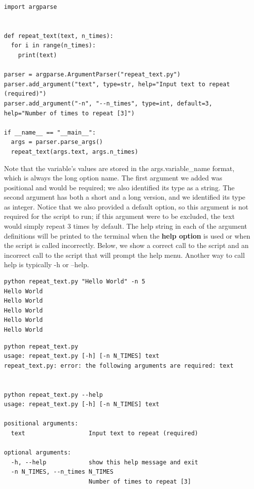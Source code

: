 \documentclass[a4paper,11pt]{article}
\begin{document}
\vspace{3mm}
\begin{lstlisting}
import argparse


def repeat_text(text, n_times):
  for i in range(n_times):
    print(text)

parser = argparse.ArgumentParser("repeat_text.py")
parser.add_argument("text", type=str, help="Input text to repeat (required)")
parser.add_argument("-n", "--n_times", type=int, default=3, help="Number of times to repeat [3]")

if __name__ == "__main__":
  args = parser.parse_args()
  repeat_text(args.text, args.n_times)

\end{lstlisting}
\vspace{3mm}

Note that the variable's values are stored in the args.variable\_name format, which is always the long option name.
The first argument we added was positional and would be required; we also identified its type as a string.  
The second argument has both a short and a long version, and we identified its type as integer.  Notice 
that we also provided a default option, so this argument is not required for the script to run; if this 
argument were to be excluded, the text would simply repeat 3 times by default.  The help string in each 
of the argument definitions will be printed to the terminal when the \textbf{help option} is used or 
when the script is called incorrectly.  Below, we show a correct call to the script and an incorrect 
call to the script that will prompt the help menu.  Another way to call help is typically -h or --help.

\vspace{3mm}
\begin{lstlisting}
python repeat_text.py "Hello World" -n 5
Hello World
Hello World
Hello World
Hello World
Hello World
\end{lstlisting}
\vspace{3mm}

\vspace{3mm}
\begin{lstlisting}
python repeat_text.py 
usage: repeat_text.py [-h] [-n N_TIMES] text
repeat_text.py: error: the following arguments are required: text


python repeat_text.py --help
usage: repeat_text.py [-h] [-n N_TIMES] text

positional arguments:
  text                  Input text to repeat (required)

optional arguments:
  -h, --help            show this help message and exit
  -n N_TIMES, --n_times N_TIMES
                        Number of times to repeat [3]
\end{lstlisting}
\vspace{3mm}
\end{document}
